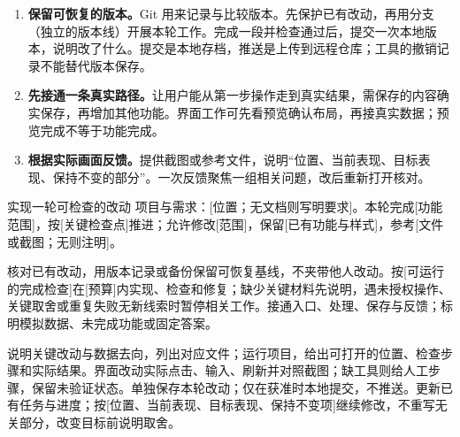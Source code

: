 \begin{enumerate}
\item \textbf{保留可恢复的版本。}Git 用来记录与比较版本。先保护已有改动，再用分支（独立的版本线）开展本轮工作。完成一段并检查通过后，提交一次本地版本，说明改了什么。提交是本地存档，推送是上传到远程仓库；工具的撤销记录不能替代版本保存。
\item \textbf{先接通一条真实路径。}让用户能从第一步操作走到真实结果，需保存的内容确实保存，再增加其他功能。界面工作可先看预览确认布局，再接真实数据；预览完成不等于功能完成。
\item \textbf{根据实际画面反馈。}提供截图或参考文件，说明“位置、当前表现、目标表现、保持不变的部分”。一次反馈聚焦一组相关问题，改后重新打开核对。
\end{enumerate}
\begin{prompt}{实现一轮可检查的改动}
项目与需求：[位置；无文档则写明要求]。本轮完成[功能范围]，按[关键检查点]推进；允许修改[范围]，保留[已有功能与样式]，参考[文件或截图；无则注明]。\par
核对已有改动，用版本记录或备份保留可恢复基线，不夹带他人改动。按[可运行的完成检查]在[预算]内实现、检查和修复；缺少关键材料先说明，遇未授权操作、关键取舍或重复失败无新线索时暂停相关工作。接通入口、处理、保存与反馈；标明模拟数据、未完成功能或固定答案。\par
说明关键改动与数据去向，列出对应文件；运行项目，给出可打开的位置、检查步骤和实际结果。界面改动实际点击、输入、刷新并对照截图；缺工具则给人工步骤，保留未验证状态。单独保存本轮改动；仅在获准时本地提交，不推送。更新已有任务与进度；按[位置、当前表现、目标表现、保持不变项]继续修改，不重写无关部分，改变目标前说明取舍。
\end{prompt}
